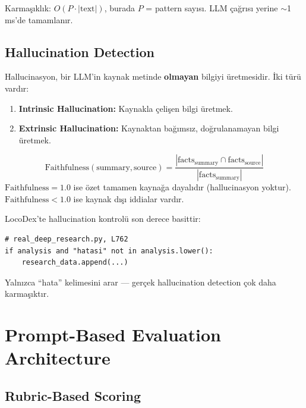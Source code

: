 Karma\c{s}{\i}kl{\i}k: $O(P \cdot |\text{text}|)$, burada $P$ = pattern say{\i}s{\i}. LLM \c{c}a\u{g}r{\i}s{\i} yerine $\sim$1\,ms'de tamamlan{\i}r.

\subsection{Hallucination Detection}

Hallucinasyon, bir LLM'in kaynak metinde \textbf{olmayan} bilgiyi \"{u}retmesidir. \.{I}ki t\"{u}r\"{u} vard{\i}r:

\begin{enumerate}
  \item \textbf{Intrinsic Hallucination:} Kaynakla \c{c}eli\c{s}en bilgi \"{u}retmek.
  \item \textbf{Extrinsic Hallucination:} Kaynaktan ba\u{g}{\i}ms{\i}z, do\u{g}rulanamayan bilgi \"{u}retmek.
\end{enumerate}

\begin{formulbox}
\begin{equation}
\label{eq:faithfulness}
\mathrm{Faithfulness}(\text{summary}, \text{source}) = \frac{|\text{facts}_{\text{summary}} \cap \text{facts}_{\text{source}}|}{|\text{facts}_{\text{summary}}|}
\end{equation}
$\mathrm{Faithfulness} = 1.0$ ise \"{o}zet tamamen kayna\u{g}a dayal{\i}d{\i}r (hallucinasyon yoktur). $\mathrm{Faithfulness} < 1.0$ ise kaynak d{\i}\c{s}{\i} iddialar vard{\i}r.
\end{formulbox}

LocoDex'te hallucination kontrol\"{u} son derece basittir:
\begin{lstlisting}
# real_deep_research.py, L762
if analysis and "hatasi" not in analysis.lower():
    research_data.append(...)
\end{lstlisting}
Yaln{\i}zca ``hata'' kelimesini arar --- ger\c{c}ek hallucination detection \c{c}ok daha karma\c{s}{\i}kt{\i}r.


\section{Prompt-Based Evaluation Architecture}
\label{sec:prompt-eval}

\subsection{Rubric-Based Scoring}

